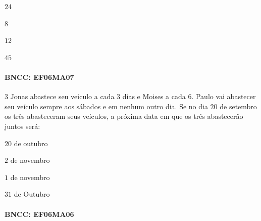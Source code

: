 \begin{escolha}
\item $24$ 
\item $8$ 
\item $12$ 
\item $45$
\end{escolha}

\paragraph{BNCC: EF06MA07 }


\num{3}  Jonas abastece seu veículo a cada $3$ dias e Moises a cada $6$. Paulo vai
abastecer seu veículo sempre aos sábados e em nenhum outro dia. Se no
dia $20$ de setembro os três abasteceram seus veículos, a próxima data em
que os três abastecerão juntos será:

\begin{escolha}
\item $20$ de outubro
\item $2$ de novembro
\item $1$ de novembro
\item $31$ de Outubro
\end{escolha}

\paragraph{BNCC: EF06MA06 }



